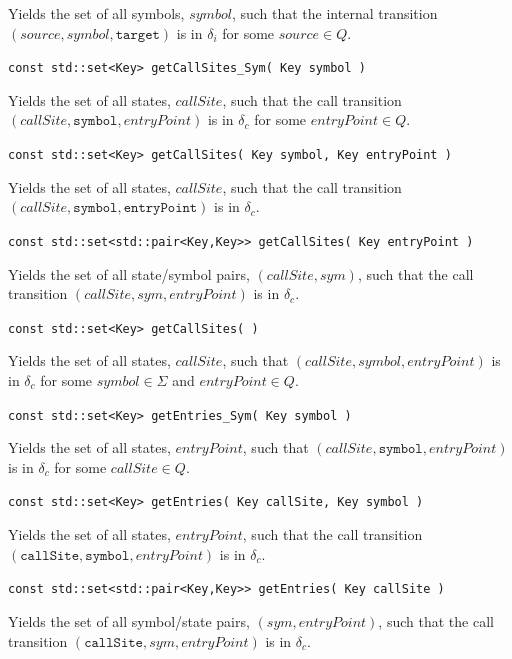 \documentclass{llncs}
\begin{document}
\begin{description}
    Yields the set of all symbols, $symbol$, such that the internal transition $(source,symbol,\texttt{target})$ is in $\delta_i$ for some $source \in Q$.

  \item\texttt{const std::set<Key> getCallSites\_Sym( Key symbol )} \nopagebreak

    Yields the set of all states, $callSite$, such that the call transition $(callSite,\texttt{symbol},entryPoint)$ is in $\delta_c$ for some $entryPoint \in Q$.

  \item\texttt{const std::set<Key> getCallSites( Key symbol, Key entryPoint )} \nopagebreak

    Yields the set of all states, $callSite$, such that the call transition $(callSite,\texttt{symbol},\texttt{entryPoint})$ is in $\delta_c$.

  \item\texttt{const std::set<std::pair<Key,Key>> getCallSites( Key entryPoint )}

    Yields the set of all state/symbol pairs, $(callSite,sym)$, such that the call transition $(callSite,sym,entryPoint)$ is in $\delta_c$. 

  \item\texttt{const std::set<Key> getCallSites( )} \nopagebreak

    Yields the set of all states, $callSite$, such that $(callSite,symbol,entryPoint)$ is in $\delta_c$ for some $symbol \in \Sigma$ and $entryPoint \in Q$.

  \item\texttt{const std::set<Key> getEntries\_Sym( Key symbol )} \nopagebreak

    Yields the set of all states, $entryPoint$, such that $(callSite,\texttt{symbol},entryPoint)$ is in $\delta_c$ for some $callSite \in Q$.

  \item\texttt{const std::set<Key> getEntries( Key callSite, Key symbol )} \nopagebreak

    Yields the set of all states, $entryPoint$, such that the call transition $(\texttt{callSite},\texttt{symbol},entryPoint)$ is in $\delta_c$.

  \item\texttt{const std::set<std::pair<Key,Key>> getEntries( Key callSite )} \nopagebreak

    Yields the set of all symbol/state pairs, $(sym,entryPoint)$, such that the call transition $(\texttt{callSite},sym,entryPoint)$ is in $\delta_c$.


\end{description}
\end{document}
